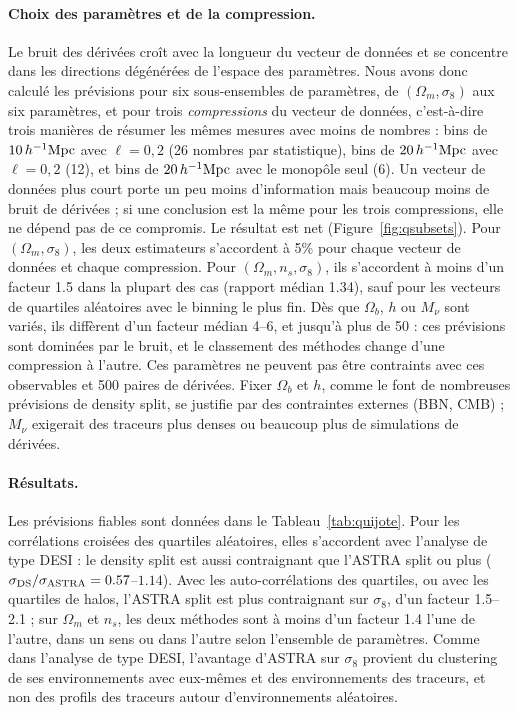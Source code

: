 \paragraph{Choix des paramètres et de la compression.} Le bruit des dérivées croît avec la longueur du vecteur de données et se concentre dans les directions dégénérées de l'espace des paramètres. Nous avons donc calculé les prévisions pour six sous-ensembles de paramètres, de $(\Omega_m,\sigma_8)$ aux six paramètres, et pour trois \emph{compressions} du vecteur de données, c'est-à-dire trois manières de résumer les mêmes mesures avec moins de nombres : bins de $10\,h^{-1}\mathrm{Mpc}$ avec $\ell=0,2$ (26 nombres par statistique), bins de $20\,h^{-1}\mathrm{Mpc}$ avec $\ell=0,2$ (12), et bins de $20\,h^{-1}\mathrm{Mpc}$ avec le monopôle seul (6). Un vecteur de données plus court porte un peu moins d'information mais beaucoup moins de bruit de dérivées ; si une conclusion est la même pour les trois compressions, elle ne dépend pas de ce compromis. Le résultat est net (Figure~\ref{fig:qsubsets}). Pour $(\Omega_m,\sigma_8)$, les deux estimateurs s'accordent à 5\% pour chaque vecteur de données et chaque compression. Pour $(\Omega_m,n_s,\sigma_8)$, ils s'accordent à moins d'un facteur 1.5 dans la plupart des cas (rapport médian 1.34), sauf pour les vecteurs de quartiles aléatoires avec le binning le plus fin. Dès que $\Omega_b$, $h$ ou $M_\nu$ sont variés, ils diffèrent d'un facteur médian 4--6, et jusqu'à plus de 50 : ces prévisions sont dominées par le bruit, et le classement des méthodes change d'une compression à l'autre. Ces paramètres ne peuvent pas être contraints avec ces observables et 500 paires de dérivées. Fixer $\Omega_b$ et $h$, comme le font de nombreuses prévisions de density split, se justifie par des contraintes externes (BBN, CMB) ; $M_\nu$ exigerait des traceurs plus denses ou beaucoup plus de simulations de dérivées.

\paragraph{Résultats.} Les prévisions fiables sont données dans le Tableau~\ref{tab:quijote}. Pour les corrélations croisées des quartiles aléatoires, elles s'accordent avec l'analyse de type DESI : le density split est aussi contraignant que l'ASTRA split ou plus ($\sigma_{\rm DS}/\sigma_{\rm ASTRA}=0.57$--$1.14$). Avec les auto-corrélations des quartiles, ou avec les quartiles de halos, l'ASTRA split est plus contraignant sur $\sigma_8$, d'un facteur 1.5--2.1 ; sur $\Omega_m$ et $n_s$, les deux méthodes sont à moins d'un facteur 1.4 l'une de l'autre, dans un sens ou dans l'autre selon l'ensemble de paramètres. Comme dans l'analyse de type DESI, l'avantage d'ASTRA sur $\sigma_8$ provient du clustering de ses environnements avec eux-mêmes et des environnements des traceurs, et non des profils des traceurs autour d'environnements aléatoires.

